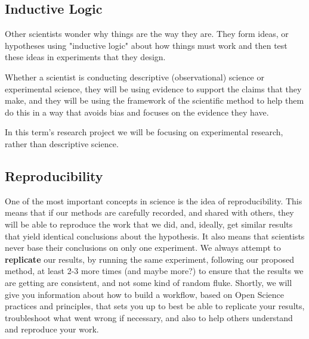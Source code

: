 \documentclass[
]{book}
\begin{document}
\hypertarget{inductive-logic}{%
\subsection*{Inductive Logic}\label{inductive-logic}}

Other scientists wonder why things are the way they are. They form ideas, or hypotheses using "inductive logic" about how things must work and then test these ideas in experiments that they design.

Whether a scientist is conducting descriptive (observational) science or experimental science, they will be using evidence to support the claims that they make, and they will be using the framework of the scientific method to help them do this in a way that avoids bias and focuses on the evidence they have.

In this term's research project we will be focusing on experimental research, rather than descriptive science.

\hypertarget{reproducibility}{%
\subsection*{Reproducibility}\label{reproducibility}}

One of the most important concepts in science is the idea of reproducibility. This means that if our methods are carefully recorded, and shared with others, they will be able to reproduce the work that we did, and, ideally, get similar results that yield identical conclusions about the hypothesis. It also means that scientists never base their conclusions on only one experiment. We always attempt to \textbf{replicate} our results, by running the same experiment, following our proposed method, at least 2-3 more times (and maybe more?) to ensure that the results we are getting are consistent, and not some kind of random fluke. Shortly, we will give you information about how to build a workflow, based on Open Science practices and principles, that sets you up to best be able to replicate your results, troubleshoot what went wrong if necessary, and also to help others understand and reproduce your work.
\end{document}
